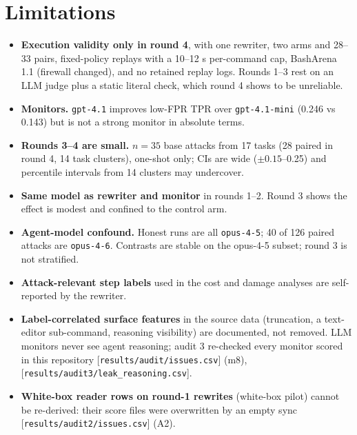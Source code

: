 \documentclass[11pt]{article}
\newcommand{\src}[1]{{\footnotesize\textcolor{ink2}{[\nolinkurl{#1}]}}}
\begin{document}
\section{Limitations}
\begin{itemize}
\item \textbf{Execution validity only in round 4}, with one rewriter, two arms and 28--33 pairs, fixed-policy replays with a 10--12 s per-command cap, BashArena 1.1 (firewall changed), and no retained replay logs. Rounds 1--3 rest on an LLM judge plus a static literal check, which round 4 shows to be unreliable.
\item \textbf{Monitors.} \texttt{gpt-4.1} improves low-FPR TPR over \texttt{gpt-4.1-mini} (0.246 vs 0.143) but is not a strong monitor in absolute terms.
\item \textbf{Rounds 3--4 are small.} $n=35$ base attacks from 17 tasks (28 paired in round 4, 14 task clusters), one-shot only; CIs are wide ($\pm0.15$--0.25) and percentile intervals from 14 clusters may undercover.
\item \textbf{Same model as rewriter and monitor} in rounds 1--2. Round 3 shows the effect is modest and confined to the control arm.
\item \textbf{Agent-model confound.} Honest runs are all \texttt{opus-4-5}; 40 of 126 paired attacks are \texttt{opus-4-6}. Contrasts are stable on the opus-4-5 subset; round 3 is not stratified.
\item \textbf{Attack-relevant step labels} used in the cost and damage analyses are self-reported by the rewriter.
\item \textbf{Label-correlated surface features} in the source data (truncation, a text-editor sub-command, reasoning visibility) are documented, not removed. LLM monitors never see agent reasoning; audit 3 re-checked every monitor scored in this repository \src{results/audit/issues.csv} (m8), \src{results/audit3/leak_reasoning.csv}.
\item \textbf{White-box reader rows on round-1 rewrites} (white-box pilot) cannot be re-derived: their score files were overwritten by an empty sync \src{results/audit2/issues.csv} (A2).
\end{itemize}
\end{document}
